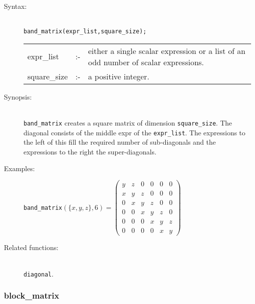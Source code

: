 \begin{description}
\item[Syntax:]\mbox{}\\
\texttt{band\_matrix(expr\_list,square\_size);}\\[2mm]
\begin{tabular}{l l p{.72\linewidth}}
expr\_list  &:-&
either a single scalar expression or a list of an odd number of scalar
expressions. \\
square\_size &:-& a positive integer.
\end{tabular}


\item[Synopsis:]\mbox{}\\
                \texttt{band\_matrix} creates a square matrix of
                dimension \texttt{square\_size}. The diagonal consists of the
                middle expr of the \texttt{expr\_list}. The expressions to the
                left of this fill the required number of sub-diagonals and the
                expressions to the right the super-diagonals.

\item[Examples:]
\begin{flushleft}
\texttt{band\_matrix}\((\{x,y,z\},6) =
 \begin{pmatrix} y & z & 0 & 0 & 0 & 0 \\
                 x & y & z & 0 & 0 & 0 \\
                 0 & x & y & z & 0 & 0 \\
                 0 & 0 & x & y & z & 0 \\
                 0 & 0 & 0 & x & y & z \\
                 0 & 0 & 0 & 0 & x & y
 \end{pmatrix}\)
\end{flushleft}

\item[Related functions:]\mbox{}\\
 \texttt{diagonal}.
\end{description}


\subsubsection{block\_matrix}
\label{linalg:block_matrix}
\hypertarget{operator:BLOCK_MATRIX}{}

